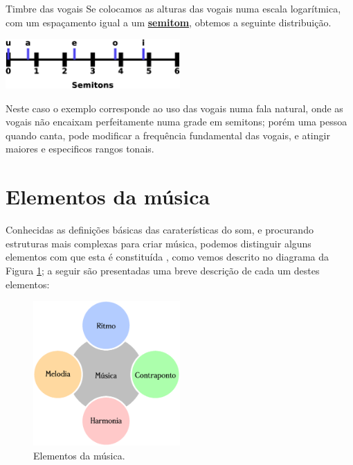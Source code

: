 \begin{elaboracion}{Timbre das vogais}
Se colocamos as alturas das vogais numa escala logarítmica, com um espaçamento igual a um
\hyperref[sec:pos:Semitom]{\textbf{semitom}},
obtemos a seguinte distribuição.
\begin{center}
\includegraphics[width=0.5\textwidth]{chapters/cap-musica-basica/vocales-semitons2a.eps}
\end{center}
Neste caso o exemplo corresponde ao uso das vogais numa fala natural, 
onde as vogais não encaixam perfeitamente numa grade em semitons;
porém uma pessoa quando canta, pode modificar a frequência fundamental das vogais,
e atingir maiores e especificos rangos tonais. 
\label{fig:timbresvocais}
\end{elaboracion}


\section{Elementos da música}
\label{sec:elementosmusica}
Conhecidas as definições básicas das caraterísticas do som, 
e procurando estruturas mais complexas para criar música,
podemos distinguir alguns elementos com que esta é constituída \cite[pp. 11]{alves2004teoria},
como vemos descrito no diagrama da Figura  \ref{fig:elementos:musica};
a seguir são presentadas uma breve descrição de cada um destes elementos:

\begin{figure}[!ht]
\centering

\includegraphics[width=0.5\textwidth]{chapters/cap-musica-basica/elementos-musica-1.eps}
\caption{Elementos da música.}
\label{fig:elementos:musica}
\end{figure}


